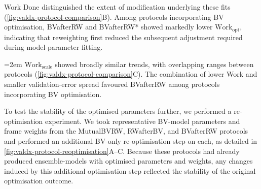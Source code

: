 Work Done distinguished the extent of modification underlying these fits (\cref{fig:valdx-protocol-comparison}B). Among protocols incorporating BV optimisation, BVafterRW and BVafterRW* showed markedly lower $\text{Work}_\text{opt}$, indicating that reweighting first reduced the subsequent adjustment required during model-parameter fitting.

{\emergencystretch=2em $\text{Work}_\text{scale}$ showed broadly similar trends, with overlapping ranges between protocols (\cref{fig:valdx-protocol-comparison}C). The combination of lower Work and smaller validation-error spread favoured BVafterRW among protocols incorporating BV optimisation.\par}

To test the stability of the optimised parameters further, we performed a re-optimisation experiment. We took representative BV-model parameters and frame weights from the MutualBVRW, RWafterBV, and BVafterRW protocols and performed an additional BV-only re-optimisation step on each, as detailed in \cref{fig:valdx-protocol-reoptimisation}A--C. Because these protocols had already produced ensemble-models with optimised parameters and weights, any changes induced by this additional optimisation step reflected the stability of the original optimisation outcome.

